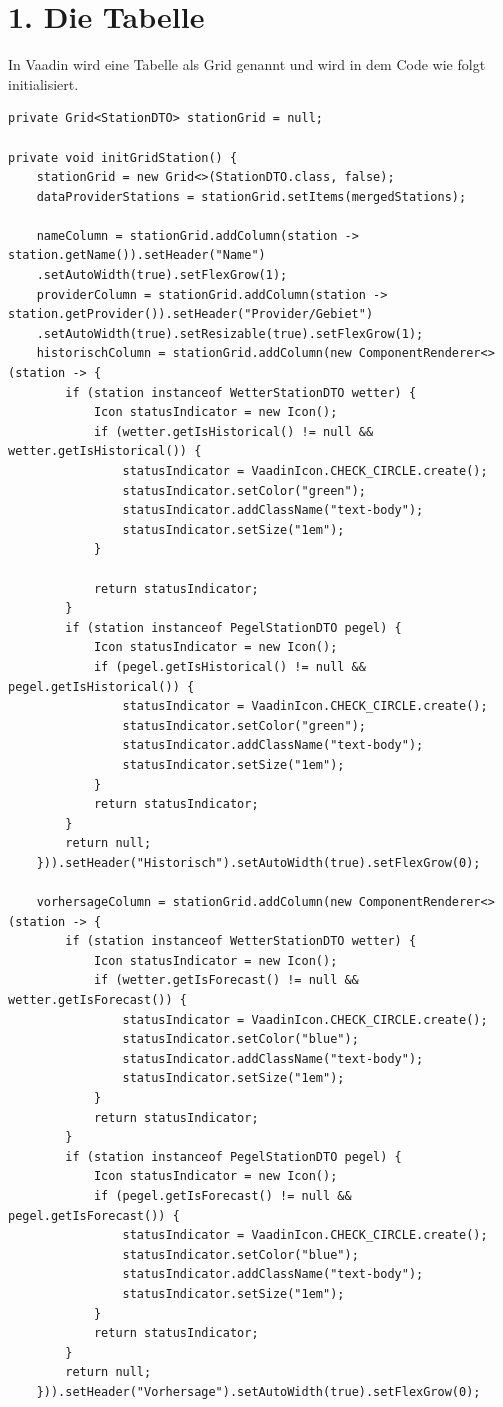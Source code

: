 \documentclass[a4paper,12pt]{scrreprt}
\begin{document}
\section*{\small \textbf{1. Die Tabelle}}
In Vaadin wird eine Tabelle als Grid genannt und wird in dem Code wie folgt initialisiert.
\begin{lstlisting}
private Grid<StationDTO> stationGrid = null;

private void initGridStation() {
	stationGrid = new Grid<>(StationDTO.class, false);
	dataProviderStations = stationGrid.setItems(mergedStations);
	
	nameColumn = stationGrid.addColumn(station -> station.getName()).setHeader("Name")
	.setAutoWidth(true).setFlexGrow(1);
	providerColumn = stationGrid.addColumn(station -> station.getProvider()).setHeader("Provider/Gebiet")
	.setAutoWidth(true).setResizable(true).setFlexGrow(1);
	historischColumn = stationGrid.addColumn(new ComponentRenderer<>(station -> {
		if (station instanceof WetterStationDTO wetter) {
			Icon statusIndicator = new Icon();
			if (wetter.getIsHistorical() != null && wetter.getIsHistorical()) {
				statusIndicator = VaadinIcon.CHECK_CIRCLE.create();
				statusIndicator.setColor("green");
				statusIndicator.addClassName("text-body");
				statusIndicator.setSize("1em");
			}
			
			return statusIndicator;
		}
		if (station instanceof PegelStationDTO pegel) {
			Icon statusIndicator = new Icon();
			if (pegel.getIsHistorical() != null && pegel.getIsHistorical()) {
				statusIndicator = VaadinIcon.CHECK_CIRCLE.create();
				statusIndicator.setColor("green");
				statusIndicator.addClassName("text-body");
				statusIndicator.setSize("1em");
			}
			return statusIndicator;
		}
		return null;
	})).setHeader("Historisch").setAutoWidth(true).setFlexGrow(0);
	
	vorhersageColumn = stationGrid.addColumn(new ComponentRenderer<>(station -> {
		if (station instanceof WetterStationDTO wetter) {
			Icon statusIndicator = new Icon();
			if (wetter.getIsForecast() != null && wetter.getIsForecast()) {
				statusIndicator = VaadinIcon.CHECK_CIRCLE.create();
				statusIndicator.setColor("blue");
				statusIndicator.addClassName("text-body");
				statusIndicator.setSize("1em");
			}
			return statusIndicator;
		}
		if (station instanceof PegelStationDTO pegel) {
			Icon statusIndicator = new Icon();
			if (pegel.getIsForecast() != null && pegel.getIsForecast()) {
				statusIndicator = VaadinIcon.CHECK_CIRCLE.create();
				statusIndicator.setColor("blue");
				statusIndicator.addClassName("text-body");
				statusIndicator.setSize("1em");
			}
			return statusIndicator;
		}
		return null;
	})).setHeader("Vorhersage").setAutoWidth(true).setFlexGrow(0);
	

\end{lstlisting}
\end{document}
